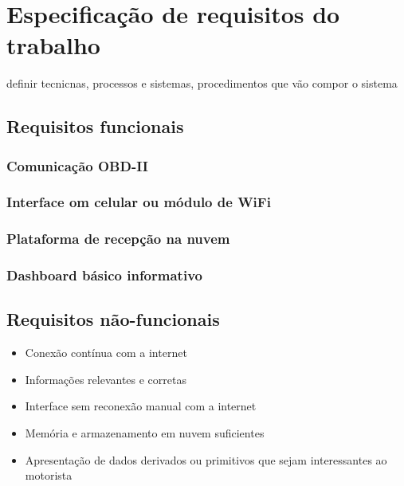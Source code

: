 \chapter{Especificação de requisitos do trabalho}

\label{CAP4}


definir tecnicnas, processos e sistemas, procedimentos que vão compor o sistema


\section{Requisitos funcionais}
\subsection{Comunicação OBD-II}
\subsection{Interface om celular ou módulo de WiFi}
\subsection{Plataforma de recepção na nuvem}
\subsection{Dashboard básico informativo}

\section{Requisitos não-funcionais}

\begin{itemize}
    \item Conexão contínua com a internet
    \item Informações relevantes e corretas
    \item Interface sem reconexão manual com a internet
    \item Memória e armazenamento em nuvem suficientes
    \item Apresentação de dados derivados ou primitivos que sejam interessantes ao motorista
\end{itemize}



